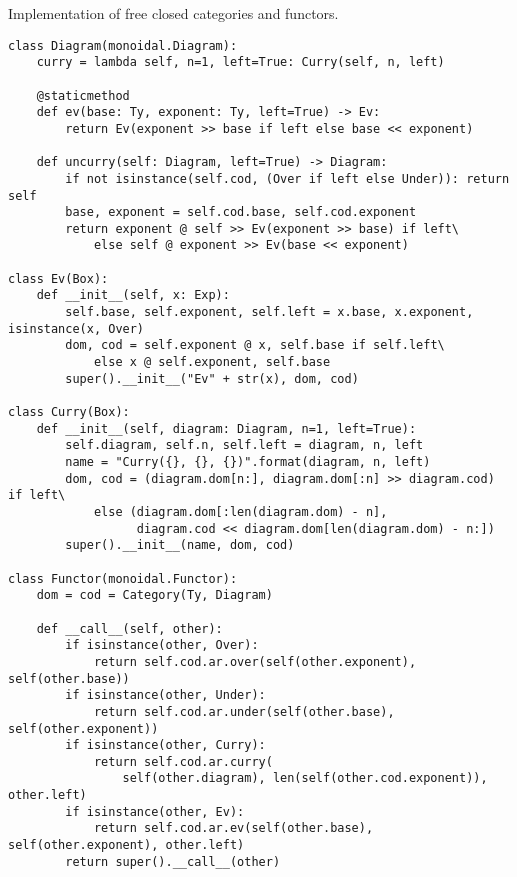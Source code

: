 \begin{python}
{\normalfont Implementation of free closed categories and functors.}

\begin{verbatim}
class Diagram(monoidal.Diagram):
    curry = lambda self, n=1, left=True: Curry(self, n, left)

    @staticmethod
    def ev(base: Ty, exponent: Ty, left=True) -> Ev:
        return Ev(exponent >> base if left else base << exponent)

    def uncurry(self: Diagram, left=True) -> Diagram:
        if not isinstance(self.cod, (Over if left else Under)): return self
        base, exponent = self.cod.base, self.cod.exponent
        return exponent @ self >> Ev(exponent >> base) if left\
            else self @ exponent >> Ev(base << exponent)

class Ev(Box):
    def __init__(self, x: Exp):
        self.base, self.exponent, self.left = x.base, x.exponent, isinstance(x, Over)
        dom, cod = self.exponent @ x, self.base if self.left\
            else x @ self.exponent, self.base
        super().__init__("Ev" + str(x), dom, cod)

class Curry(Box):
    def __init__(self, diagram: Diagram, n=1, left=True):
        self.diagram, self.n, self.left = diagram, n, left
        name = "Curry({}, {}, {})".format(diagram, n, left)
        dom, cod = (diagram.dom[n:], diagram.dom[:n] >> diagram.cod) if left\
            else (diagram.dom[:len(diagram.dom) - n],
                  diagram.cod << diagram.dom[len(diagram.dom) - n:])
        super().__init__(name, dom, cod)

class Functor(monoidal.Functor):
    dom = cod = Category(Ty, Diagram)

    def __call__(self, other):
        if isinstance(other, Over):
            return self.cod.ar.over(self(other.exponent), self(other.base))
        if isinstance(other, Under):
            return self.cod.ar.under(self(other.base), self(other.exponent))
        if isinstance(other, Curry):
            return self.cod.ar.curry(
                self(other.diagram), len(self(other.cod.exponent)), other.left)
        if isinstance(other, Ev):
            return self.cod.ar.ev(self(other.base), self(other.exponent), other.left)
        return super().__call__(other)
\end{verbatim}
\end{python}

